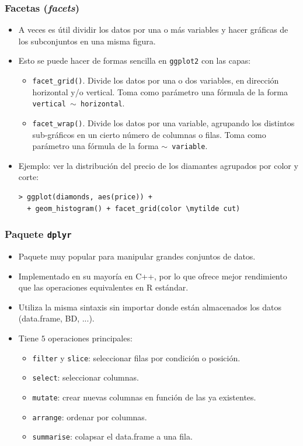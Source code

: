 \documentclass{beamer}
\newcommand{\mytilde}{$\sim$}
\begin{document}
\begin{frame}[fragile]
\frametitle{Facetas (\textit{facets})}

\begin{itemize}
\item A veces es útil dividir los datos por una o más variables y hacer gráficas de los subconjuntos en una misma figura.
\item Esto se puede hacer de formas sencilla en \texttt{ggplot2} con las capas:
\begin{itemize}
\item \texttt{facet\_grid()}. Divide los datos por una o dos variables, en dirección horizontal y/o vertical. Toma como parámetro una fórmula de la forma \texttt{vertical \mytilde\  horizontal}.
\item \texttt{facet\_wrap()}. Divide los datos por una variable, agrupando los distintos sub-gráficos en un cierto número de columnas o filas. Toma como parámetro una fórmula de la forma \texttt{\mytilde\  variable}.
\end{itemize}

\item Ejemplo: ver la distribución del precio de los diamantes agrupados por color y corte:
\begin{Verbatim}[commandchars=\\\{\}]
  > ggplot(diamonds, aes(price)) +
  + geom_histogram() + facet_grid(color \mytilde cut)
\end{Verbatim}
\end{itemize}
\end{frame}

\begin{frame}
\frametitle{Paquete \texttt{dplyr}}

\begin{itemize}
\item Paquete muy popular para manipular grandes conjuntos de datos.
\item Implementado en su mayoría en C++, por lo que ofrece mejor rendimiento que las operaciones equivalentes en R estándar.
\item Utiliza la misma sintaxis sin importar donde están almacenados los datos (data.frame, BD, ...).
\item Tiene $5$ operaciones principales:
\begin{itemize}
\item \texttt{filter} y \texttt{slice}: seleccionar filas por condición o posición.
\item \texttt{select}: seleccionar columnas.
\item \texttt{mutate}: crear nuevas columnas en función de las ya existentes.
\item \texttt{arrange}: ordenar por columnas.
\item \texttt{summarise}: colapsar el data.frame a una fila.
\end{itemize}
\end{itemize}
\end{frame}
\end{document}
